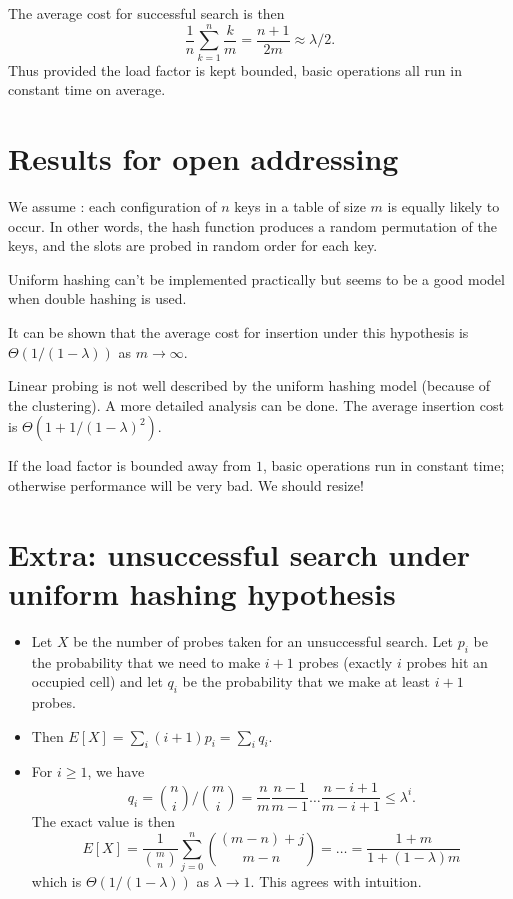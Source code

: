 The average cost for successful search is then 
$$
\frac{1}{n} \sum_{k=1}^n \frac{k}{m} = \frac{n+1}{2m} \approx \lambda/2.
$$
Thus provided the load factor is kept bounded, basic operations all run in 
constant time on average. 


\section*{Results for open addressing}

We assume : each configuration of 
$n$ keys in a table of size $m$ is equally likely to occur. In other words, the 
hash function produces a random permutation of the keys, and the slots are 
probed in random order for each key.

Uniform hashing can't be implemented practically but seems to be a good 
model when double hashing is used.

It can be shown that the average cost for insertion under this 
hypothesis is $\Theta(1/(1-\lambda))$ as $m \to \infty$. 

Linear probing is not well described by the uniform hashing model 
(because of the clustering). A more detailed analysis can be done. 
The average insertion cost is $\Theta(1 + 1/(1 - \lambda)^2)$.

If the load factor is bounded away from $1$, basic operations 
run in constant time; otherwise performance will be very bad. We should resize!


\section*{Extra: unsuccessful search under uniform hashing hypothesis}
\begin{itemize}
\item Let $X$ be the number of probes taken for an unsuccessful search. 
Let $p_i$ be the probability that we need to make $i+1$ probes 
(exactly $i$ probes hit an occupied cell) and let $q_i$ be the probability 
that we make at least $i+1$ probes. 
\item Then 
$E[X] = \sum_i (i+1) p_i = \sum_i q_i$.
\item For $i \geq 1$, we have
$$ q_i = \binom{n}{i}/\binom{m}{i} = \frac{n}{m} \frac{n-1}{m-1} 
\dots \frac{n - i + 1}{m - i + 1}  \leq \lambda^i.
$$
The exact value is then
$$
E[X] = \frac{1}{\binom{m}{n}} \sum_{j=0}^n \binom{(m-n)+j}{m-n} = 
\dots = \frac{1+m}{1+(1-\lambda)m}
$$
which is $\Theta(1/(1 - \lambda))$ as $\lambda \to 1$. This agrees with 
intuition.
\end{itemize}

